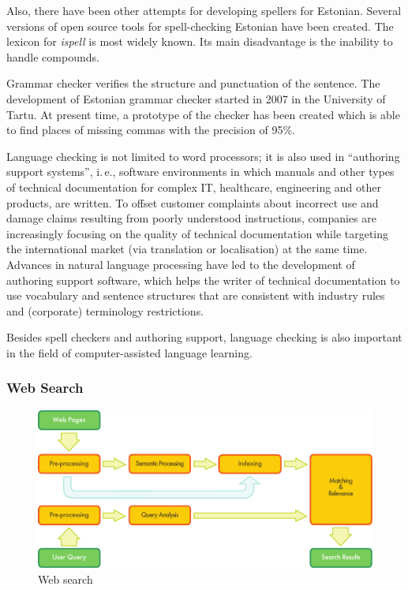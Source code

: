 \documentclass[]{../metanetpaper}
\begin{document}
\begin{multicols}{2}
Also, there have been other attempts for developing spellers for Estonian. 
Several versions of open source tools for spell-checking Estonian have been created. 
The lexicon for \textit{ispell} is most widely known. 
Its main disadvantage is the inability to handle compounds. 

Grammar checker verifies the structure and punctuation of the sentence. 
The development of Estonian grammar checker started in 2007 in the University of Tartu. 
At present time, a prototype of the checker has been created which is able to find places of missing commas with the precision of 95\%.

Language checking is not limited to word processors; it is also used
in ``authoring support systems'', i.\,e., software environments in
which manuals and other types of technical documentation for complex
IT, healthcare, engineering and other products, are written. To offset
customer complaints about incorrect use and damage claims resulting
from poorly understood instructions, companies are increasingly
focusing on the quality of technical documentation while targeting the
international market (via translation or localisation) at the same
time. Advances in natural language processing have led to the
development of authoring support software, which helps the writer of
technical documentation to use vocabulary and sentence structures that
are consistent with industry rules and (corporate) terminology
restrictions. 

Besides spell checkers and authoring support, language checking is also important in the field of computer-assisted language learning. 

\subsubsection{Web Search}

\begin{figure}[htb]
  \center
  \includegraphics[width=\textwidth]{../_media/english/web_search_architecture}
  \caption{Web search}
  \label{fig:websearcharch_en}
 \end{figure}


\end{multicols}
\end{document}
